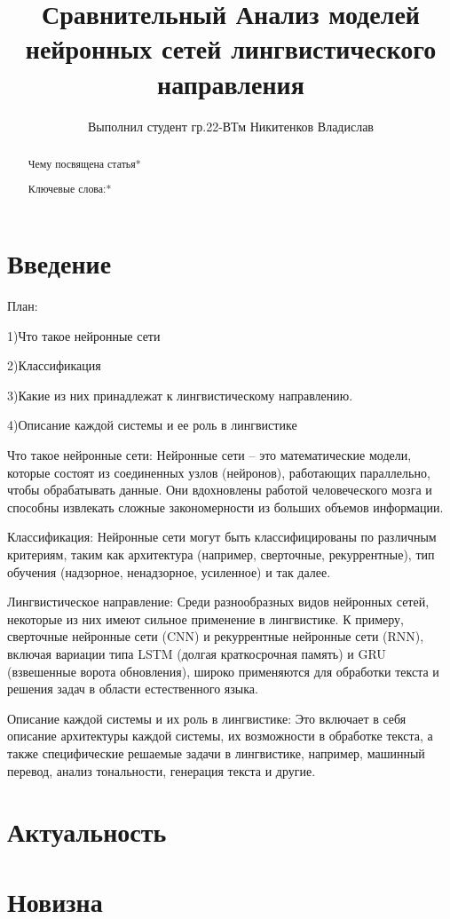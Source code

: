 \documentclass{article}
\title{Сравнительный Анализ моделей нейронных сетей лингвистического направления}
\author{Выполнил студент гр.22-ВТм Никитенков Владислав}
\begin{document}
\maketitle

\begin{abstract}
Чему посвящена статья*

Ключевые слова:*
\end{abstract}

\section{Введение}
План:

1)Что такое нейронные сети

2)Классификация

3)Какие из них принадлежат к лингвистическому направлению.

4)Описание каждой системы и ее роль в лингвистике

Что такое нейронные сети:
Нейронные сети – это математические модели, которые состоят из соединенных узлов (нейронов), работающих параллельно, чтобы обрабатывать данные. Они вдохновлены работой человеческого мозга и способны извлекать сложные закономерности из больших объемов информации.

Классификация:
Нейронные сети могут быть классифицированы по различным критериям, таким как архитектура (например, сверточные, рекуррентные), тип обучения (надзорное, ненадзорное, усиленное) и так далее.

Лингвистическое направление:
Среди разнообразных видов нейронных сетей, некоторые из них имеют сильное применение в лингвистике. К примеру, сверточные нейронные сети (CNN) и рекуррентные нейронные сети (RNN), включая вариации типа LSTM (долгая краткосрочная память) и GRU (взвешенные ворота обновления), широко применяются для обработки текста и решения задач в области естественного языка.

Описание каждой системы и их роль в лингвистике:
Это включает в себя описание архитектуры каждой системы, их возможности в обработке текста, а также специфические решаемые задачи в лингвистике, например, машинный перевод, анализ тональности, генерация текста и другие.
\section{Актуальность}
\section{Новизна}
\end{document}

